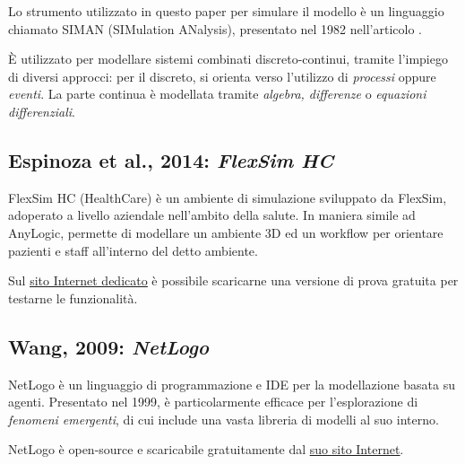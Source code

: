 Lo strumento utilizzato in questo paper per simulare il modello è un linguaggio chiamato SIMAN (SIMulation ANalysis), presentato nel 1982 nell'articolo \textit{\cite{pegden_simulation_1982}}. 

È utilizzato per modellare sistemi combinati discreto-continui, tramite l'impiego di diversi approcci: per il discreto, si orienta verso l'utilizzo di \textit{processi} oppure \textit{eventi}. 
La parte continua è modellata tramite \textit{algebra, differenze} o \textit{equazioni differenziali}. 


\subsection{Espinoza et al., 2014: \textit{FlexSim HC}}

FlexSim HC (HealthCare) è un ambiente di simulazione sviluppato da FlexSim, adoperato  a livello aziendale nell'ambito della salute. 
In maniera simile ad AnyLogic, permette di modellare un ambiente 3D ed un workflow per orientare pazienti e staff all'interno del detto ambiente. 

Sul \underline{\href{https://www.flexsim.com/healthcare/flexsim-hc/}{sito Internet dedicato}} è possibile scaricarne una versione di prova gratuita per testarne le funzionalità. 

\subsection{Wang, 2009: \textit{NetLogo}}

NetLogo è un linguaggio di programmazione e IDE per la modellazione basata su agenti. 
Presentato nel 1999, è particolarmente efficace per l'esplorazione di \textit{fenomeni emergenti}, di cui include una vasta libreria di modelli al suo interno. 

NetLogo è open-source e scaricabile gratuitamente dal \underline{\href{http://ccl.northwestern.edu/netlogo/}{suo sito Internet}}. 





